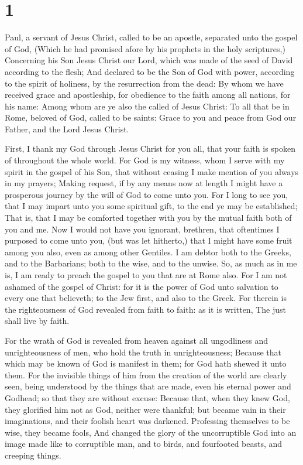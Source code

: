 \hypertarget{section}{%
\section{1}\label{section}}

 Paul, a servant of Jesus Christ, called to be an apostle,
separated unto the gospel of God,  (Which he had promised
afore by his prophets in the holy scriptures,)  Concerning
his Son Jesus Christ our Lord, which was made of the seed of David
according to the flesh;  And declared to be the Son of God
with power, according to the spirit of holiness, by the resurrection
from the dead:  By whom we have received grace and
apostleship, for obedience to the faith among all nations, for his name:
 Among whom are ye also the called of Jesus Christ:
 To all that be in Rome, beloved of God, called to be
saints: Grace to you and peace from God our Father, and the Lord Jesus
Christ.

 First, I thank my God through Jesus Christ for you all,
that your faith is spoken of throughout the whole world. 
For God is my witness, whom I serve with my spirit in the gospel of his
Son, that without ceasing I make mention of you always in my prayers;
 Making request, if by any means now at length I might have
a prosperous journey by the will of God to come unto you. 
For I long to see you, that I may impart unto you some spiritual gift,
to the end ye may be established;  That is, that I may be
comforted together with you by the mutual faith both of you and me.
 Now I would not have you ignorant, brethren, that
oftentimes I purposed to come unto you, (but was let hitherto,) that I
might have some fruit among you also, even as among other Gentiles.
 I am debtor both to the Greeks, and to the Barbarians;
both to the wise, and to the unwise.  So, as much as in me
is, I am ready to preach the gospel to you that are at Rome also.
 For I am not ashamed of the gospel of Christ: for it is
the power of God unto salvation to every one that believeth; to the Jew
first, and also to the Greek.  For therein is the
righteousness of God revealed from faith to faith: as it is written, The
just shall live by faith.

 For the wrath of God is revealed from heaven against all
ungodliness and unrighteousness of men, who hold the truth in
unrighteousness;  Because that which may be known of God is
manifest in them; for God hath shewed it unto them.  For
the invisible things of him from the creation of the world are clearly
seen, being understood by the things that are made, even his eternal
power and Godhead; so that they are without excuse: 
Because that, when they knew God, they glorified him not as God, neither
were thankful; but became vain in their imaginations, and their foolish
heart was darkened.  Professing themselves to be wise, they
became fools,  And changed the glory of the uncorruptible
God into an image made like to corruptible man, and to birds, and
fourfooted beasts, and creeping things.

